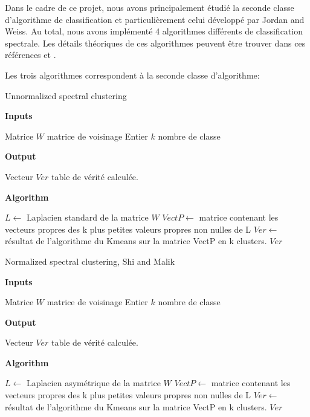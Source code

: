 \medskip


Dans le cadre de ce projet, nous avons principalement étudié la seconde classe d'algorithme de classification et particulièrement celui développé par Jordan and Weiss. Au total, nous avons implémenté 4 algorithmes différents de classification spectrale. Les détails théoriques de ces algorithmes peuvent être trouver dans ces références \cite{von2007tutorial} et \cite{shi2000normalized}.

\medskip

Les trois algorithmes correspondent à la seconde classe d'algorithme:

\begin{algorithm}[H]
  \caption{Unnormalized spectral clustering }
  
  \textbf{Inputs}%
  \begin{algorithmic}[1]
    \STATE Matrice $W$ matrice de voisinage
    \STATE Entier $k$ nombre de classe
  \end{algorithmic}
  \bigskip

  \textbf{Output}%
  \begin{algorithmic}[1]
    \STATE Vecteur $Ver$ table de vérité calculée.
  \end{algorithmic}
  \bigskip
  
  \textbf{Algorithm}
  \begin{algorithmic}[1]
		\STATE $L\gets$ Laplacien standard de la matrice $W$
     	\STATE $VectP\gets$ matrice contenant les vecteurs propres des k plus petites valeurs propres non nulles de L
     	\STATE $Ver\gets$ résultat de l'algorithme du Kmeans sur la matrice VectP en k clusters.	
  \RETURN $Ver$
  \end{algorithmic}
\end{algorithm}



\begin{algorithm}[H]
  \caption{Normalized spectral clustering, Shi and Malik }
  
  \textbf{Inputs}%
  \begin{algorithmic}[1]
    \STATE Matrice $W$ matrice de voisinage
    \STATE Entier $k$ nombre de classe
  \end{algorithmic}
  \bigskip

  \textbf{Output}%
  \begin{algorithmic}[1]
    \STATE Vecteur $Ver$ table de vérité calculée.
  \end{algorithmic}
  \bigskip
  
  \textbf{Algorithm}
  \begin{algorithmic}[1]
		\STATE $L\gets$ Laplacien asymétrique de la matrice $W$
     	\STATE $VectP\gets$ matrice contenant les vecteurs propres des k plus petites valeurs propres non nulles de L
     	\STATE $Ver\gets$ résultat de l'algorithme du Kmeans sur la matrice VectP en k clusters.	
  \RETURN $Ver$
  \end{algorithmic}
\end{algorithm}





